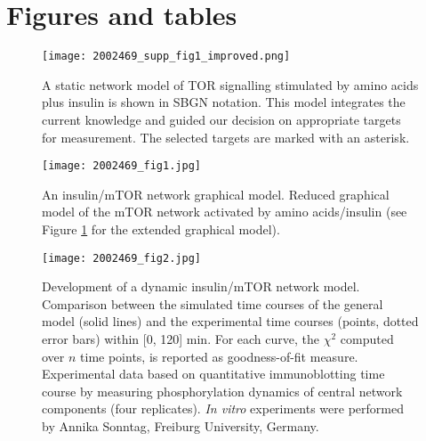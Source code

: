 \section{Figures and tables}
\label{paper1-sec:Figures and tables}

\begin{figure}[tb]
	\begin{center}
		\texttt{[image: 2002469\_supp\_fig1\_improved.png]}
		\caption[Extended graphical model of the mammalian TOR network]{A static network model of TOR signalling stimulated by amino acids plus insulin is shown in SBGN notation. This model integrates the current knowledge and guided our decision on appropriate targets for measurement. The selected targets are marked with an asterisk.}
		\label{fig:2002469_supp_fig1}
	\end{center}
\end{figure}
\clearpage

\begin{figure}[tb]
	\begin{center}
		\texttt{[image: 2002469\_fig1.jpg]}
		\caption[An insulin/mTOR network graphical model]{An insulin/mTOR network graphical model. Reduced graphical model of the mTOR network activated by amino acids/insulin (see Figure \ref{fig:2002469_supp_fig1} for the extended graphical model).}
		\label{fig:2002469_fig1}
	\end{center}
\end{figure}
\clearpage

\begin{figure}[tb]
	\begin{center}
		\texttt{[image: 2002469\_fig2.jpg]}
		\caption[Development of a dynamic insulin/mTOR network model]{Development of a dynamic insulin/mTOR network model. Comparison between the simulated time courses of the general model (solid lines) and the experimental time courses (points, dotted error bars) within [0, 120] min. For each curve, the $\chi^2$ computed over $n$ time points, is reported as goodness-of-fit measure. Experimental data based on quantitative immunoblotting time course by measuring phosphorylation dynamics of central network components (four replicates). \emph{In vitro} experiments were performed by Annika Sonntag, Freiburg University, Germany.}
		\label{fig:2002469_fig2}
	\end{center}
\end{figure}
\clearpage

